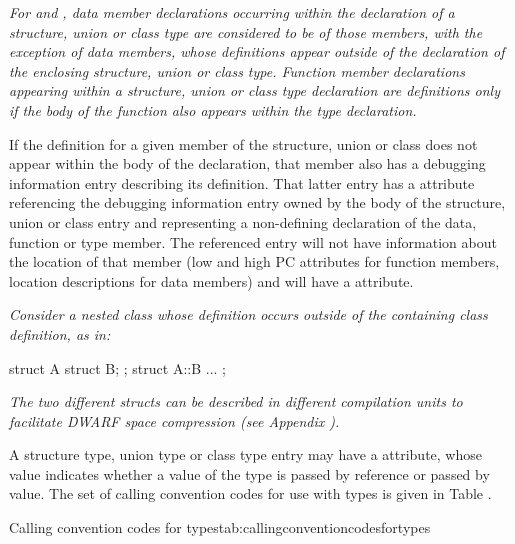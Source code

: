 {\textit{For  and , 
data 
member declarations occurring within
the declaration of a structure, union or class type are
considered to be  of those members, with
the exception of  data members, whose definitions
appear outside of the declaration of the enclosing structure,
union or class type. Function member declarations appearing
within a structure, union or class type declaration are
definitions only if the body of the function also appears
within the type declaration.}

If the definition for a given member of the structure, union
or class does not appear within the body of the declaration,
that member also has a debugging information entry describing
its definition. That latter entry has a 
\DWATspecification{} attribute 
referencing the debugging information entry
owned by the body of the structure, union or class entry and
representing a non-defining declaration of the data, function
or type member. The referenced entry will not have information
about the location of that member (low and high PC attributes
for function members, location descriptions for data members)
and will have a \DWATdeclaration{} attribute.

\textit{Consider a nested class whose 
definition occurs outside of the containing class definition, as in:}

\begin{nlnlisting}
struct A {
    struct B;
};
struct A::B { ... };
\end{nlnlisting}

\textit{The two different structs can be described in 
different compilation units to 
facilitate DWARF space compression 
(see Appendix ).}

A structure type, union type or class type entry may have a
\DWATcallingconventionDEFN{} attribute,
whose value indicates whether a value of the type 
is passed by reference 
or passed by value. The set of calling convention codes for use with types 
is\hypertarget{chap:DWATcallingconventionfortypes}{}
given in Table .

\begin{simplenametable}[2.2in]{Calling convention codes for types}{tab:callingconventioncodesfortypes}
\DWCCnormal             \\
\DWCCpassbyvalueTARG        \\
\DWCCpassbyreferenceTARG    \\
\end{simplenametable}

}
